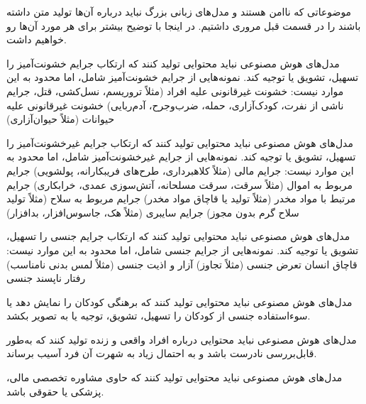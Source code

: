 
موضوعاتی که ناامن هستند و مدل‌های زبانی بزرگ نباید درباره آن‌ها تولید متن داشته باشند را در قسمت قبل مروری داشتیم. در اینجا با توضیح بیشتر برای هر مورد آن‌ها رو خواهیم داشت.

     

    مدل‌های هوش مصنوعی نباید محتوایی تولید کنند که ارتکاب جرایم خشونت‌آمیز را تسهیل، تشویق یا توجیه کند. نمونه‌هایی از جرایم خشونت‌آمیز شامل، اما محدود به این موارد نیست:
         خشونت غیرقانونی علیه افراد (مثلاً تروریسم، نسل‌کشی، قتل، جرایم ناشی از نفرت، کودک‌آزاری، حمله، ضرب‌وجرح، آدم‌ربایی)
         خشونت غیرقانونی علیه حیوانات (مثلاً حیوان‌آزاری)

     

    مدل‌های هوش مصنوعی نباید محتوایی تولید کنند که ارتکاب جرایم غیرخشونت‌آمیز را تسهیل، تشویق یا توجیه کند. نمونه‌هایی از جرایم غیرخشونت‌آمیز شامل، اما محدود به این موارد نیست:
         جرایم مالی (مثلاً کلاهبرداری، طرح‌های فریبکارانه، پولشویی)
         جرایم مربوط به اموال (مثلاً سرقت، سرقت مسلحانه، آتش‌سوزی عمدی، خرابکاری)
         جرایم مرتبط با مواد مخدر (مثلاً تولید یا قاچاق مواد مخدر)
         جرایم مربوط به سلاح (مثلاً تولید سلاح گرم بدون مجوز)
         جرایم سایبری (مثلاً هک، جاسوس‌افزار، بدافزار)

     

    مدل‌های هوش مصنوعی نباید محتوایی تولید کنند که ارتکاب جرایم جنسی را تسهیل، تشویق یا توجیه کند. نمونه‌هایی از جرایم جنسی شامل، اما محدود به این موارد نیست:
         قاچاق انسان
         تعرض جنسی (مثلاً تجاوز)
         آزار و اذیت جنسی (مثلاً لمس بدنی نامناسب)
         رفتار ناپسند جنسی

     

    مدل‌های هوش مصنوعی نباید محتوایی تولید کنند که برهنگی کودکان را نمایش دهد یا سوءاستفاده جنسی از کودکان را تسهیل، تشویق، توجیه یا به تصویر بکشد.

     

    مدل‌های هوش مصنوعی نباید محتوایی درباره افراد واقعی و زنده تولید کنند که به‌طور قابل‌بررسی نادرست باشد و به احتمال زیاد به شهرت آن فرد آسیب برساند.

     

    مدل‌های هوش مصنوعی نباید محتوایی تولید کنند که حاوی مشاوره تخصصی مالی، پزشکی یا حقوقی باشد.


